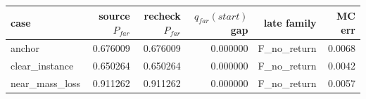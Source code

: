 \begin{tabular}{lrrrrr}
\toprule
case & source $P_{far}$ & recheck $P_{far}$ & $q_{far}(start)$ gap & late family & MC err \\
\midrule
anchor & 0.676009 & 0.676009 & 0.000000 & F\_no\_return & 0.0068 \\
clear\_instance & 0.650264 & 0.650264 & 0.000000 & F\_no\_return & 0.0042 \\
near\_mass\_loss & 0.911262 & 0.911262 & 0.000000 & F\_no\_return & 0.0057 \\
\bottomrule
\end{tabular}
